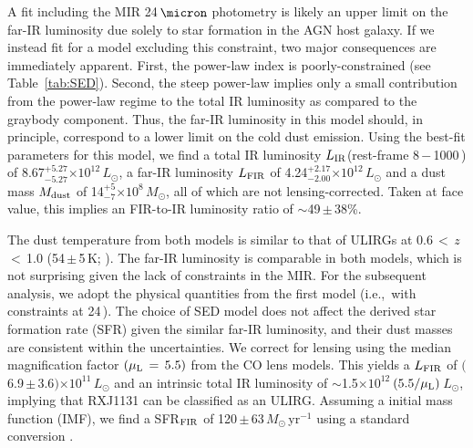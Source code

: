 \documentclass[]{emulateapj}
\newcommand{\Msun}{\mbox{$M_{\odot}$}\xspace}
\newcommand{\Lsun}{\mbox{$L_{\odot}$}\xspace}
\newcommand{\LIR}{\mbox{$L_{\rm IR}$}\xspace}
\newcommand{\LFIR}{\mbox{$L_{\rm FIR}$}\xspace}
\newcommand{\sfrU}{\mbox{\Msun\,yr$^{-1}$}\xspace}
\newcommand{\E}[1]{\mbox{$\times10^{#1}$}}
\newcommand{\petm}[2]{$^{+#1}_{-#2}$}
\newcommand{\eq}{\,=\,}
\newcommand{\pmm}{\,$\pm$\,}
\newcommand{\ie}{{i.e.,~}}
\newcommand{\Tab}[1]{Table~\ref{tab:#1}}
\newcommand{\SF}{star formation\xspace}
\newcommand{\fir}{far-IR\xspace}
\begin{document}
A fit including the MIR 24\,$\micron$ photometry
is likely an upper limit on the \fir luminosity due solely to \SF
in the AGN host galaxy.
If we instead fit for a model excluding this constraint,
two major consequences are immediately apparent.
First, the power-law index is poorly-constrained (see \Tab{SED}).
Second, the steep power-law implies only a small contribution
from the power-law regime
to the total IR luminosity as compared to the graybody component.
Thus, the \fir luminosity in
this model should, in principle, correspond to a
lower limit on the cold dust emission.
Using the best-fit parameters
for this model, we find a total IR luminosity
\LIR (rest-frame 8\,$-$\,1000\,\micron) of 8.67\petm{5.27}{5.27}\E{12}\,\Lsun,
a \fir luminosity \LFIR of 4.24\petm{2.17}{2.00}\E{12}\,\Lsun and a
dust mass $M_{\rm dust}$ of 14\petm{5}{7}\E{8}\,\Msun, all of which are not lensing-corrected.
Taken at face value, this implies an FIR-to-IR luminosity ratio
of $\sim$49\pmm38\%.

The dust temperature from both models is similar to that of
ULIRGs at 0.6\,$<$\,$z$\,$<$\,1.0 (54\,$\pm$\,5\,K;
\citealt[hereafter C13]{Combes13a}).
The \fir luminosity is comparable in both models, which is
not surprising given the lack of constraints in the MIR.
For the subsequent analysis, we adopt the physical quantities
from the first model (\ie with constraints at 24\,\micron).
The choice of SED model does not affect
the derived star formation rate (SFR) given the similar \fir luminosity, and
their dust masses are consistent within the uncertainties.
We correct for lensing using the median magnification
factor $(\mu_{\rm L}\eq5.5)$
from the CO lens models. This yields a
\LFIR of $($6.9\pmm3.6$)$\E{11}\,\Lsun
and
an intrinsic total IR luminosity of $\sim$1.5\E{12}\,$(5.5/\mu_{\rm L})$\,\Lsun, implying that RXJ1131 can be classified as an ULIRG.
Assuming a \citet{Salpeter55a} initial
mass function (IMF), we find a
SFR$_{\rm FIR}$ of 120\pmm63\,\sfrU using a
standard conversion \citep{Kennicutt98a}.
\end{document}
